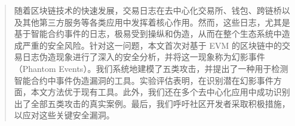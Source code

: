 \begin{abstract}
随着区块链技术的快速发展，交易日志在去中心化交易所、钱包、跨链桥以及其他第三方服务等各类应用中发挥着核心作用。然而，这些日志，尤其是基于智能合约事件的日志，极易受到操纵和伪造，从而在整个生态系统中造成严重的安全风险。针对这一问题，本文首次对基于 EVM 的区块链中的交易日志伪造现象进行了深入的安全分析，并将这一现象称为幻影事件（Phantom Events）。我们系统地建模了五类攻击，并提出了一种用于检测智能合约中事件伪造漏洞的工具。实验评估表明，在识别潜在幻影事件方面，本文方法优于现有工具。此外，我们还在多个去中心化应用中成功识别出了全部五类攻击的真实案例。最后，我们呼吁社区开发者采取积极措施，以应对这些关键安全漏洞。
\end{abstract}
